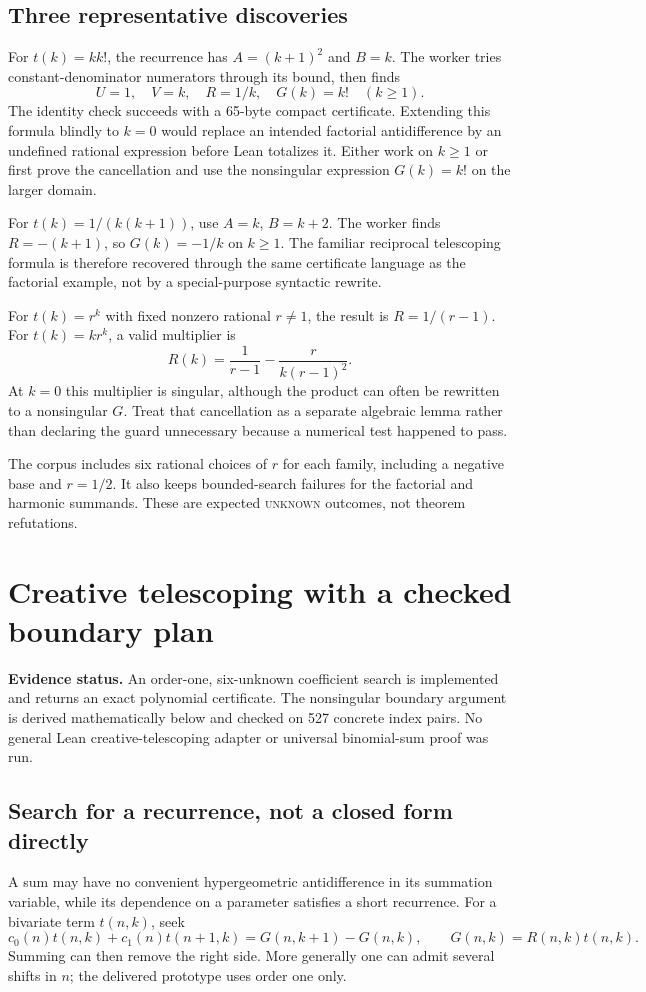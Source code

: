 \documentclass[11pt,letterpaper]{article}
\newcommand{\unknown}{\textsc{unknown}}
\newcommand{\status}[1]{\par\smallskip\noindent\textbf{Evidence status.} #1\par\smallskip}
\theoremstyle{definition}\newtheorem{definition}[theorem]{Definition}
\theoremstyle{remark}\newtheorem{remark}[theorem]{Remark}
\begin{document}
\subsection{Three representative discoveries}
For $t(k)=k k!$, the recurrence has $A=(k+1)^2$ and $B=k$. The worker tries
constant-denominator numerators through its bound, then finds
\[
 U=1,\quad V=k,\quad R=1/k,\quad G(k)=k!\quad(k\ge1).
\]
The identity check succeeds with a 65-byte compact certificate. Extending this
formula blindly to $k=0$ would replace an intended factorial antidifference by
an undefined rational expression before Lean totalizes it. Either work on
$k\ge1$ or first prove the cancellation and use the nonsingular expression
$G(k)=k!$ on the larger domain.

For $t(k)=1/(k(k+1))$, use $A=k$, $B=k+2$. The worker finds $R=-(k+1)$,
so $G(k)=-1/k$ on $k\ge1$. The familiar reciprocal telescoping formula is
therefore recovered through the same certificate language as the factorial
example, not by a special-purpose syntactic rewrite.

For $t(k)=r^k$ with fixed nonzero rational $r\ne1$, the result is
$R=1/(r-1)$. For $t(k)=kr^k$, a valid multiplier is
\[
 R(k)=\frac{1}{r-1}-\frac{r}{k(r-1)^2}.
\]
At $k=0$ this multiplier is singular, although the product can often be
rewritten to a nonsingular $G$. Treat that cancellation as a separate algebraic
lemma rather than declaring the guard unnecessary because a numerical test
happened to pass.

The corpus includes six rational choices of $r$ for each family, including a
negative base and $r=1/2$. It also keeps bounded-search failures for the
factorial and harmonic summands. These are expected \unknown{} outcomes,
not theorem refutations.

\section{Creative telescoping with a checked boundary plan}
\label{sec:creative}
\status{An order-one, six-unknown coefficient search is implemented and returns
an exact polynomial certificate. The nonsingular boundary argument is derived
mathematically below and checked on 527 concrete index pairs. No general Lean
creative-telescoping adapter or universal binomial-sum proof was run.}

\subsection{Search for a recurrence, not a closed form directly}
A sum may have no convenient hypergeometric antidifference in its summation
variable, while its dependence on a parameter satisfies a short recurrence.
For a bivariate term $t(n,k)$, seek
\begin{equation}
 c_0(n)t(n,k)+c_1(n)t(n+1,k)
   =G(n,k+1)-G(n,k),\qquad G(n,k)=R(n,k)t(n,k).
 \label{eq:creative}
\end{equation}
Summing can then remove the right side. More generally one can admit several
shifts in $n$; the delivered prototype uses order one only.
\end{document}
